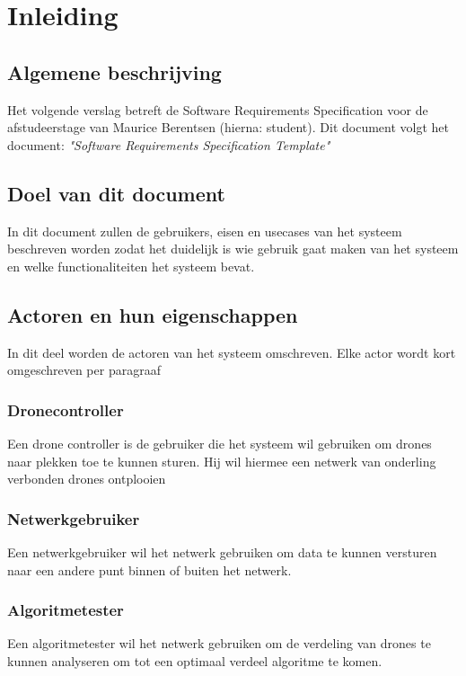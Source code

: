 \documentclass[a4paper, 11pt, oneside]{report}
\begin{document}
\chapter{Inleiding}
\label{inleiding}
\section{Algemene beschrijving}
\label{inleiding:beschrijving}
Het volgende verslag betreft de Software Requirements Specification voor de afstudeerstage van Maurice Berentsen (hierna: student).
Dit document volgt het document: \textit{"Software Requirements Specification Template"} \cite{template:srs}
 

\section{Doel van dit document}
\label{inleiding:doelvanditdoucment}

In dit document zullen de gebruikers, eisen en usecases van het systeem beschreven worden zodat het duidelijk is wie gebruik gaat maken van het systeem en welke functionaliteiten het systeem bevat.   

\section{Actoren en hun eigenschappen}
\label{inleiding:gebruikers}
In dit deel worden de actoren van het systeem omschreven. 
Elke actor wordt kort omgeschreven per paragraaf 

\subsection{Dronecontroller}
\label{inleiding:gebruikers:dronecontroller}
Een drone controller is de gebruiker die het systeem wil gebruiken om drones naar plekken toe te kunnen sturen.
Hij wil hiermee een netwerk van onderling verbonden drones ontplooien  

\subsection{Netwerkgebruiker}
\label{inleiding:gebruikers:netwerkgebruiker}
Een netwerkgebruiker wil het netwerk gebruiken om data te kunnen versturen naar een andere punt binnen of buiten het netwerk. 

\subsection{Algoritmetester}
\label{inleiding:gebruikers:algoritmetester}
Een algoritmetester wil het netwerk gebruiken om de verdeling van drones te kunnen analyseren om tot een optimaal verdeel algoritme te komen.
\end{document}
